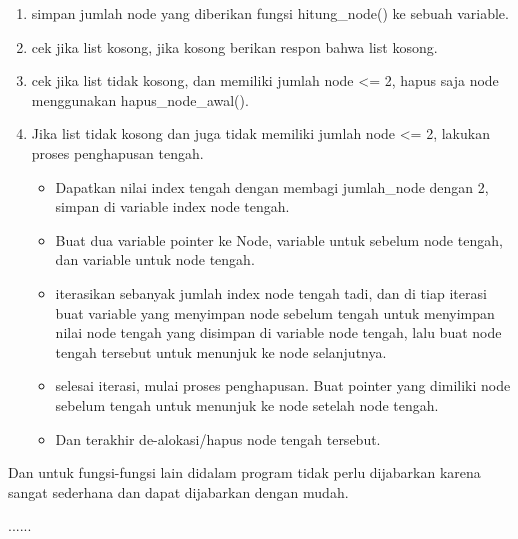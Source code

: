 \documentclass[12pt, a4paper]{article}
\begin{document}
  \begin{enumerate}
    \item simpan jumlah node yang diberikan fungsi hitung\_node() ke
      sebuah variable.
    \item cek jika list kosong, jika kosong berikan respon bahwa list kosong.
    \item cek jika list tidak kosong, dan memiliki jumlah node <= 2, hapus saja
      node menggunakan hapus\_node\_awal().
    \item Jika list tidak kosong dan juga tidak memiliki jumlah node <= 2, lakukan
      proses penghapusan tengah.
      \begin{itemize}
        \item Dapatkan nilai index tengah dengan membagi jumlah\_node dengan 2, simpan di variable index node tengah.
        \item Buat dua variable pointer ke Node, variable untuk sebelum node tengah, dan variable untuk node tengah.
        \item iterasikan sebanyak jumlah index node tengah tadi, dan di tiap iterasi buat variable yang menyimpan
          node sebelum tengah untuk menyimpan nilai node tengah yang disimpan di variable node tengah, lalu buat
          node tengah tersebut untuk menunjuk ke node selanjutnya.
        \item selesai iterasi, mulai proses penghapusan. Buat pointer yang dimiliki node sebelum tengah untuk menunjuk
          ke node setelah node tengah.
        \item Dan terakhir de-alokasi/hapus node tengah tersebut.
      \end{itemize}
  \end{enumerate}

  Dan untuk fungsi-fungsi lain didalam program tidak perlu dijabarkan karena sangat sederhana dan dapat dijabarkan
  dengan mudah.

  \begin{center}
    ......
  \end{center}
\end{document}
